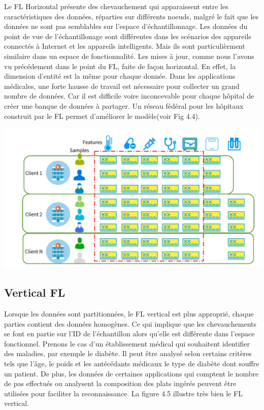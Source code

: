 \documentclass[12pt,a4paper,french]{report}
\begin{document}
Le FL Horizontal présente des chevauchement qui apparaissent entre les caractéristiques des données, réparties sur différents noeuds, malgré le fait que les données ne sont pas semblables sur l'espace d'échantillonnage. Les données du point de vue de l'échantillonage sont différentes dans les scénarios des appareils connectés à Internet et les appareils intelligents. Mais ils sont particulièrment similaire dans un espace de fonctionnalité. Les mises à jour, comme nous l'avons vu précédement dans le point du FL, faite de façon horizontal. En effet, la dimension d'entité est la même pour chaque donnée. Dans les applications médicales, une forte hausse de travail est nécessaire pour collecter un grand nombre de données. Car il est difficile voire inconcevable pour chaque hôpital de créer une banque de données à partager. Un réseau fédéral pour les hôpitaux construit par le FL permet d'améliorer le modèle(voir Fig 4.4).

\begin{center}
	\includegraphics[scale=0.2]{fl_horizontal}
	\label{fig1}
\end{center}


\subsection{Vertical FL}

Lorsque les données sont partitionnées, le FL vertical est plus approprié, chaque parties contient des données homogènes. Ce qui implique que les chevauchements se font en partie sur l'ID de l'échantillon alors qu'elle est différente dans l'espace fonctionnel. Prenons le cas d'un établissement médical qui souhaitent identifier des maladies, par exemple le diabète. Il peut être analysé selon certains critères tels que l'âge, le poids et les antécédants médicaux le type de diabète dont souffre un patient. De plus, les données de certaines applications qui comptent le nombre de pas effectués ou analysent la composition des plats ingérés peuvent être utilisées pour faciliter la reconnaissance. La figure 4.5 illustre très bien le FL vertical.
\end{document}
